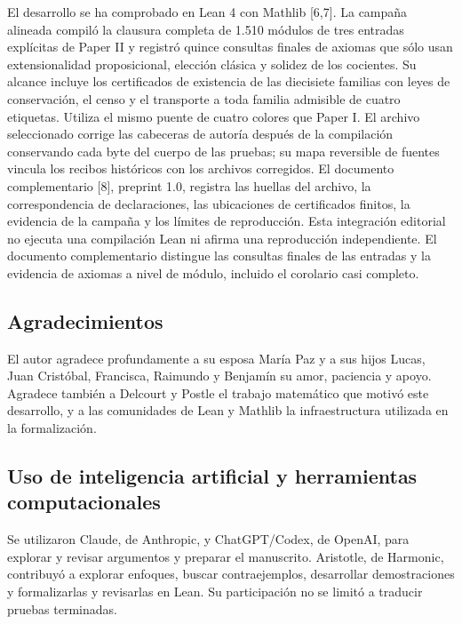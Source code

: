\documentclass[spanish,11pt,a4paper]{article}
\begin{document}
El desarrollo se ha comprobado en Lean 4 con Mathlib {[}6,7{]}. La campaña alineada compiló la clausura completa de 1.510 módulos de tres entradas explícitas de Paper II y registró quince consultas finales de axiomas que sólo usan extensionalidad proposicional, elección clásica y solidez de los cocientes. Su alcance incluye los certificados de existencia de las diecisiete familias con leyes de conservación, el censo y el transporte a toda familia admisible de cuatro etiquetas. Utiliza el mismo puente de cuatro colores que Paper I. El archivo seleccionado corrige las cabeceras de autoría después de la compilación conservando cada byte del cuerpo de las pruebas; su mapa reversible de fuentes vincula los recibos históricos con los archivos corregidos. El documento complementario {[}8{]}, preprint 1.0, registra las huellas del archivo, la correspondencia de declaraciones, las ubicaciones de certificados finitos, la evidencia de la campaña y los límites de reproducción. Esta integración editorial no ejecuta una compilación Lean ni afirma una reproducción independiente. El documento complementario distingue las consultas finales de las entradas y la evidencia de axiomas a nivel de módulo, incluido el corolario casi completo.

\subsection{Agradecimientos}\label{agradecimientos}

El autor agradece profundamente a su esposa María Paz y a sus hijos Lucas, Juan Cristóbal, Francisca, Raimundo y Benjamín su amor, paciencia y apoyo. Agradece también a Delcourt y Postle el trabajo matemático que motivó este desarrollo, y a las comunidades de Lean y Mathlib la infraestructura utilizada en la formalización.

\subsection{Uso de inteligencia artificial y herramientas computacionales}\label{uso-de-inteligencia-artificial-y-herramientas-computacionales}

Se utilizaron Claude, de Anthropic, y ChatGPT/Codex, de OpenAI, para explorar y revisar argumentos y preparar el manuscrito. Aristotle, de Harmonic, contribuyó a explorar enfoques, buscar contraejemplos, desarrollar demostraciones y formalizarlas y revisarlas en Lean. Su participación no se limitó a traducir pruebas terminadas.
\end{document}
